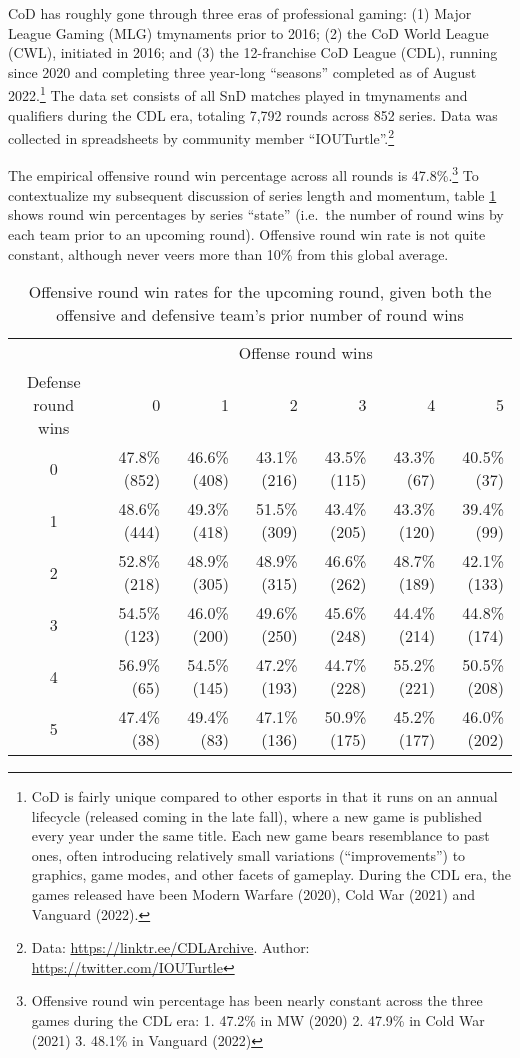 \documentclass{article}
\begin{document}
CoD has roughly gone through three eras of professional gaming: (1)
Major League Gaming (MLG) tmynaments prior to 2016; (2) the CoD World
League (CWL), initiated in 2016; and (3) the 12-franchise CoD League
(CDL), running since 2020 and completing three year-long ``seasons''
completed as of August 2022.\footnote{CoD is fairly unique compared to
  other esports in that it runs on an annual lifecycle (released coming
  in the late fall), where a new game is published every year under the
  same title. Each new game bears resemblance to past ones, often
  introducing relatively small variations (``improvements'') to
  graphics, game modes, and other facets of gameplay. During the CDL
  era, the games released have been Modern Warfare (2020), Cold War
  (2021) and Vanguard (2022).} The data set consists of all SnD matches
played in tmynaments and qualifiers during the CDL era, totaling 7,792
rounds across 852 series. Data was collected in spreadsheets by
community member ``IOUTurtle''.\footnote{Data:
  \url{https://linktr.ee/CDLArchive}. Author:
  \url{https://twitter.com/IOUTurtle}}

The empirical offensive round win percentage across all rounds is
47.8\%.\footnote{Offensive round win percentage has been nearly constant
  across the three games during the CDL era: 1. 47.2\% in MW (2020) 2.
  47.9\% in Cold War (2021) 3. 48.1\% in Vanguard (2022)} To
contextualize my subsequent discussion of series length and momentum,
table \ref{tbl:cod-o-win-prop-by-series-state} shows round win
percentages by series ``state'' (i.e.~the number of round wins by each
team prior to an upcoming round). Offensive round win rate is not quite
constant, although never veers more than 10\% from this global average.

\begin{longtable}{crrrrrr}
  \caption{Offensive round win rates for the upcoming round, given both the offensive and defensive team's prior number of round wins}\label{tbl:cod-o-win-prop-by-series-state} \\
  \toprule
   & \multicolumn{6}{c}{Offense round wins} \\ 
  \cmidrule(lr){2-7}
  Defense round wins & 0 & 1 & 2 & 3 & 4 & 5 \\ 
    \midrule
    0 & 47.8\%
    (852) & 46.6\%
    (408) & 43.1\%
    (216) & 43.5\%
    (115) & 43.3\%
    (67) & 40.5\%
    (37) \\ 
    1 & 48.6\%
    (444) & 49.3\%
    (418) & 51.5\%
    (309) & 43.4\%
    (205) & 43.3\%
    (120) & 39.4\%
    (99) \\ 
    2 & 52.8\%
    (218) & 48.9\%
    (305) & 48.9\%
    (315) & 46.6\%
    (262) & 48.7\%
    (189) & 42.1\%
    (133) \\ 
    3 & 54.5\%
    (123) & 46.0\%
    (200) & 49.6\%
    (250) & 45.6\%
    (248) & 44.4\%
    (214) & 44.8\%
    (174) \\ 
    4 & 56.9\%
    (65) & 54.5\%
    (145) & 47.2\%
    (193) & 44.7\%
    (228) & 55.2\%
    (221) & 50.5\%
    (208) \\ 
    5 & 47.4\%
    (38) & 49.4\%
    (83) & 47.1\%
    (136) & 50.9\%
    (175) & 45.2\%
    (177) & 46.0\%
    (202) \\ 
  \bottomrule
\end{longtable}
\end{document}
